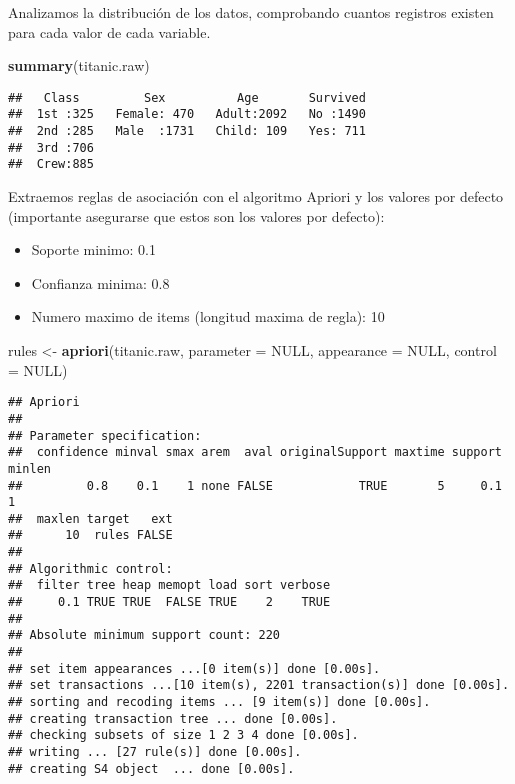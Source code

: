 \documentclass[]{article}
\newenvironment{Shaded}{\begin{snugshade}}{\end{snugshade}}
\newcommand{\DataTypeTok}[1]{\textcolor[rgb]{0.13,0.29,0.53}{#1}}
\newcommand{\KeywordTok}[1]{\textcolor[rgb]{0.13,0.29,0.53}{\textbf{#1}}}
\newcommand{\NormalTok}[1]{#1}
\newcommand{\OtherTok}[1]{\textcolor[rgb]{0.56,0.35,0.01}{#1}}
\newcommand{\StringTok}[1]{\textcolor[rgb]{0.31,0.60,0.02}{#1}}
\providecommand{\tightlist}{%
  \setlength{\itemsep}{0pt}\setlength{\parskip}{0pt}}
\begin{document}
Analizamos la distribución de los datos, comprobando cuantos registros
existen para cada valor de cada variable.

\begin{Shaded}
\begin{Highlighting}[]
\KeywordTok{summary}\NormalTok{(titanic.raw)}
\end{Highlighting}
\end{Shaded}

\begin{verbatim}
##   Class         Sex          Age       Survived  
##  1st :325   Female: 470   Adult:2092   No :1490  
##  2nd :285   Male  :1731   Child: 109   Yes: 711  
##  3rd :706                                        
##  Crew:885
\end{verbatim}

Extraemos reglas de asociación con el algoritmo Apriori y los valores
por defecto (importante asegurarse que estos son los valores por
defecto):

\begin{itemize}
\tightlist
\item
  Soporte minimo: 0.1
\item
  Confianza minima: 0.8
\item
  Numero maximo de items (longitud maxima de regla): 10
\end{itemize}

\begin{Shaded}
\begin{Highlighting}[]
\NormalTok{rules <-}\StringTok{ }\KeywordTok{apriori}\NormalTok{(titanic.raw, }\DataTypeTok{parameter =} \OtherTok{NULL}\NormalTok{, }\DataTypeTok{appearance =} \OtherTok{NULL}\NormalTok{, }\DataTypeTok{control =} \OtherTok{NULL}\NormalTok{)}
\end{Highlighting}
\end{Shaded}

\begin{verbatim}
## Apriori
## 
## Parameter specification:
##  confidence minval smax arem  aval originalSupport maxtime support minlen
##         0.8    0.1    1 none FALSE            TRUE       5     0.1      1
##  maxlen target   ext
##      10  rules FALSE
## 
## Algorithmic control:
##  filter tree heap memopt load sort verbose
##     0.1 TRUE TRUE  FALSE TRUE    2    TRUE
## 
## Absolute minimum support count: 220 
## 
## set item appearances ...[0 item(s)] done [0.00s].
## set transactions ...[10 item(s), 2201 transaction(s)] done [0.00s].
## sorting and recoding items ... [9 item(s)] done [0.00s].
## creating transaction tree ... done [0.00s].
## checking subsets of size 1 2 3 4 done [0.00s].
## writing ... [27 rule(s)] done [0.00s].
## creating S4 object  ... done [0.00s].
\end{verbatim}
\end{document}
